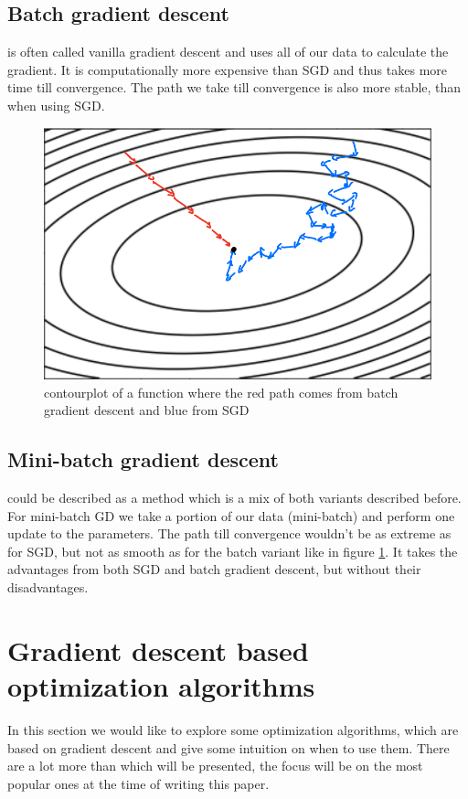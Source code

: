 \documentclass[aodsor,preprint]{imsart}
\numberwithin{equation}{section}
\theoremstyle{plain}
\begin{document}
\subsection{Batch gradient descent}
is often called vanilla gradient descent and uses all of our data to calculate the gradient. It is computationally more expensive than SGD and thus takes more time till convergence. The path we take till convergence is also more stable, than when using SGD.

\begin{figure}[htb]
\centering
\includegraphics[scale=0.3]{images/contour.png}
\caption{contourplot of a function where the red path comes from batch gradient descent and blue from SGD}
\label{fig:contour}
\end{figure}

\subsection{Mini-batch gradient descent}
could be described as a method which is a mix of both variants described before. For mini-batch GD we take a portion of our data (mini-batch) and perform one update to the parameters. The path till convergence wouldn't be as extreme as for SGD, but not as smooth as for the batch variant like in figure \ref{fig:contour}. It takes the advantages from both SGD and batch gradient descent, but without their disadvantages.

\section{Gradient descent based optimization algorithms}
In this section we would like to explore some optimization algorithms, which are based on gradient descent and give some intuition on when to use them. There are a lot more than which will be presented, the focus will be on the most popular ones at the time of writing this paper.
\end{document}
